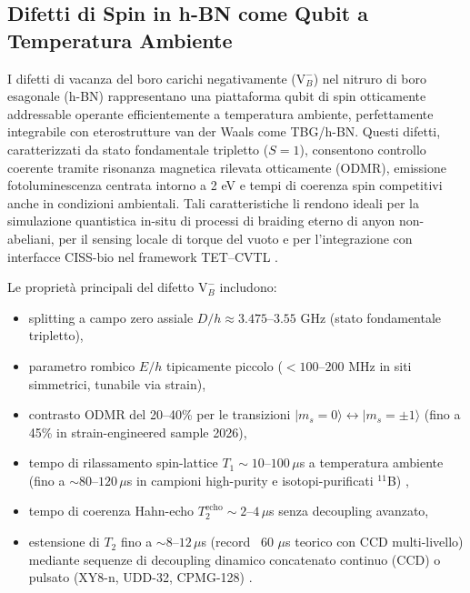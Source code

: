 \documentclass[11pt,a4paper]{article}
\let\oldcite\cite
\renewcommand{\cite}{\protect\oldcite}
\theoremstyle{plain}
\theoremstyle{definition}
\begin{document}
\subsection{Difetti di Spin in h-BN come Qubit a Temperatura Ambiente}

I difetti di vacanza del boro carichi negativamente ($\mathrm{V}_B^-$) nel nitruro di boro esagonale (h-BN) rappresentano una piattaforma qubit di spin otticamente addressable operante efficientemente a temperatura ambiente, perfettamente integrabile con eterostrutture van der Waals come TBG/h-BN. Questi difetti, caratterizzati da stato fondamentale tripletto ($S=1$), consentono controllo coerente tramite risonanza magnetica rilevata otticamente (ODMR), emissione fotoluminescenza centrata intorno a 2 eV e tempi di coerenza spin competitivi anche in condizioni ambientali. Tali caratteristiche li rendono ideali per la simulazione quantistica in-situ di processi di braiding eterno di anyon non-abeliani, per il sensing locale di torque del vuoto e per l'integrazione con interfacce CISS-bio nel framework TET--CVTL \cite{Gottscholl2021, Ramsay2023, Rizzato2023, Bourrellier2025, Abdi2026}.

Le proprietà principali del difetto $\mathrm{V}_B^-$ includono:
\begin{itemize}
    \item splitting a campo zero assiale $D/h \approx 3.475$--$3.55$ GHz (stato fondamentale tripletto),
    \item parametro rombico $E/h$ tipicamente piccolo ($< 100$--$200$ MHz in siti simmetrici, tunabile via strain),
    \item contrasto ODMR del 20--40\% per le transizioni $|m_s=0\rangle \leftrightarrow |m_s=\pm 1\rangle$ (fino a 45\% in strain-engineered sample 2026),
    \item tempo di rilassamento spin-lattice $T_1 \sim 10$--$100\,\mu$s a temperatura ambiente (fino a $\sim 80$--$120\,\mu$s in campioni high-purity e isotopi-purificati $^{11}$B) \cite{Abdi2026},
    \item tempo di coerenza Hahn-echo $T_2^{\mathrm{echo}} \sim 2$--$4\,\mu$s senza decoupling avanzato,
    \item estensione di $T_2$ fino a $\sim 8$--$12\,\mu$s (record ~60 $\mu$s teorico con CCD multi-livello) mediante sequenze di decoupling dinamico concatenato continuo (CCD) o pulsato (XY8-n, UDD-32, CPMG-128) \cite{Ramsay2023, Rizzato2023, Bourrellier2025}.
\end{itemize}
\end{document}
